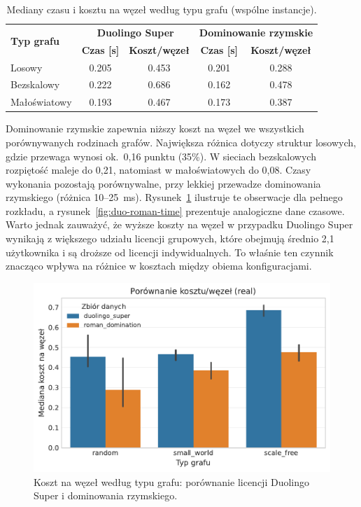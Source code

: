 \begin{table}[H]
  \centering
  \caption{Mediany czasu i kosztu na węzeł według typu grafu (wspólne instancje).}
  \label{tab:duo-roman-graph}
  \begin{tabular}{lcccc}
    \toprule
    \multirow{2}{*}{\textbf{Typ grafu}} & \multicolumn{2}{c}{\textbf{Duolingo Super}} & \multicolumn{2}{c}{\textbf{Dominowanie rzymskie}}                                            \\
                                        & \textbf{Czas [s]}                           & \textbf{Koszt/węzeł}                              & \textbf{Czas [s]} & \textbf{Koszt/węzeł} \\
    \midrule
    Losowy                              & 0.205                                       & 0.453                                             & 0.201             & 0.288                \\
    Bezskalowy                          & 0.222                                       & 0.686                                             & 0.162             & 0.478                \\
    Małoświatowy                        & 0.193                                       & 0.467                                             & 0.173             & 0.387                \\
    \bottomrule
  \end{tabular}
\end{table}

Dominowanie rzymskie zapewnia niższy koszt na węzeł we wszystkich porównywanych rodzinach grafów. Największa różnica dotyczy struktur losowych, gdzie przewaga wynosi ok.~0,16 punktu (35\%). W sieciach bezskalowych rozpiętość maleje do 0,21, natomiast w małoświatowych do 0,08. Czasy wykonania pozostają porównywalne, przy lekkiej przewadze dominowania rzymskiego (różnica 10--25~ms). Rysunek~\ref{fig:duo-roman-cost} ilustruje te obserwacje dla pełnego rozkładu, a rysunek~\ref{fig:duo-roman-time} prezentuje analogiczne dane czasowe. Warto jednak zauważyć, że wyższe koszty na węzeł w przypadku Duolingo Super wynikają z większego udziału licencji grupowych, które obejmują średnio 2,1 użytkownika i są droższe od licencji indywidualnych. To właśnie ten czynnik znacząco wpływa na różnice w kosztach między obiema konfiguracjami.

\begin{figure}[H]
  \centering
  \includegraphics[width=0.6\linewidth]{assets/figures/benchmark/real/duo_vs_roman_cost_per_node_by_graph.pdf}
  \caption{Koszt na węzeł według typu grafu: porównanie licencji Duolingo Super i dominowania rzymskiego.}
  \label{fig:duo-roman-cost}
\end{figure}

